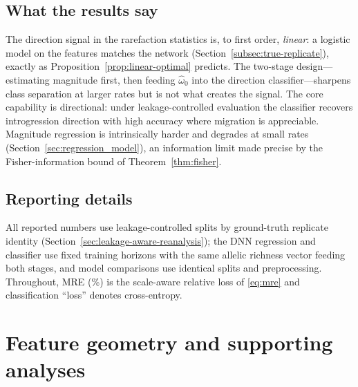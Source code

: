 \documentclass[11pt]{article}
\theoremstyle{plain}
\theoremstyle{definition}
\theoremstyle{remark}
\begin{document}
\subsection{What the results say}
\label{subsec:interpretation}
The direction signal in the rarefaction statistics is, to first order, \emph{linear}: a logistic
model on the features matches the network (Section~\ref{subsec:true-replicate}), exactly as
Proposition~\ref{prop:linear-optimal} predicts. The two-stage design---estimating magnitude first,
then feeding $\widehat{\omega}_0$ into the direction classifier---sharpens class separation at larger
rates but is not what creates the signal. The core capability is directional: under
leakage-controlled evaluation the classifier recovers introgression direction with high accuracy
where migration is appreciable. Magnitude regression is intrinsically harder and
degrades at small rates (Section~\ref{sec:regression_model}), an information limit made precise by
the Fisher-information bound of Theorem~\ref{thm:fisher}.

\subsection{Reporting details}
\label{subsec:reporting}
All reported numbers use leakage-controlled splits by ground-truth replicate identity
(Section~\ref{sec:leakage-aware-reanalysis}); the DNN regression and classifier use fixed
training horizons with the same allelic richness vector feeding both stages, and model
comparisons use identical splits and preprocessing. Throughout, MRE (\%) is the scale-aware
relative loss of \eqref{eq:mre} and classification ``loss'' denotes cross-entropy.




\section{Feature geometry and supporting analyses}
\label{sec:supporting}
\end{document}
